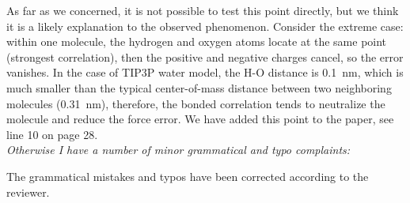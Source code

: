 \documentclass[a4paper]{article}
\begin{document}
As far as we concerned, it is not possible to test this point
directly, but we think it is a likely explanation to the observed
phenomenon.  Consider the extreme case: within one molecule, the
hydrogen and oxygen atoms locate at the same point (strongest
correlation), then the positive and negative charges cancel, so the
error vanishes. In the case of TIP3P water model, the H-O distance is 0.1~nm,
which is much smaller than the typical
center-of-mass distance between two neighboring molecules (0.31~nm),
therefore, the bonded correlation tends to neutralize the molecule
and reduce the force error.
We have added this point to the paper, see line 10 on page 28.
\\

\textit{
Otherwise I have a number of minor grammatical and typo complaints:
}

The grammatical mistakes and typos have been corrected according to the reviewer.

            

               
\end{document}
